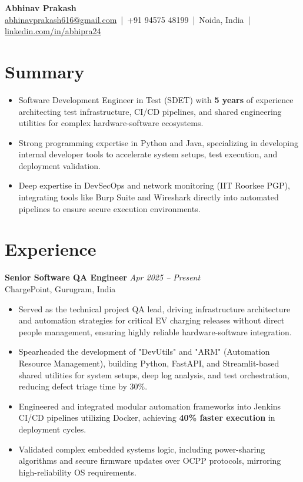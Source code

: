 \documentclass[a4paper,10pt]{article}
\begin{document}
\begin{center}
    {\Huge \textbf{Abhinav Prakash}}\\[4pt]
    \href{mailto:abhinavprakash616@gmail.com}{abhinavprakash616@gmail.com} \,|\, 
    +91 94575 48199 \,|\, 
    Noida, India \,|\, 
    \href{https://linkedin.com/in/abhipra24}{linkedin.com/in/abhipra24}
\end{center}

\section{Summary}
\begin{itemize}
    \item Software Development Engineer in Test (SDET) with \textbf{5 years} of experience architecting test infrastructure, CI/CD pipelines, and shared engineering utilities for complex hardware-software ecosystems.
    \item Strong programming expertise in Python and Java, specializing in developing internal developer tools to accelerate system setups, test execution, and deployment validation.
    \item Deep expertise in DevSecOps and network monitoring (IIT Roorkee PGP), integrating tools like Burp Suite and Wireshark directly into automated pipelines to ensure secure execution environments. 
\end{itemize}

\section{Experience}

\textbf{Senior Software QA Engineer} \hfill \textit{Apr 2025 – Present}\\
ChargePoint, Gurugram, India
\begin{itemize}
    \item Served as the technical project QA lead, driving infrastructure architecture and automation strategies for critical EV charging releases without direct people management, ensuring highly reliable hardware-software integration.
    \item Spearheaded the development of "DevUtils" and "ARM" (Automation Resource Management), building Python, FastAPI, and Streamlit-based shared utilities for system setups, deep log analysis, and test orchestration, reducing defect triage time by 30\%.
    \item Engineered and integrated modular automation frameworks into Jenkins CI/CD pipelines utilizing Docker, achieving \textbf{40\% faster execution} in deployment cycles.
    \item Validated complex embedded systems logic, including power-sharing algorithms and secure firmware updates over OCPP protocols, mirroring high-reliability OS requirements.
\end{itemize}
\end{document}
